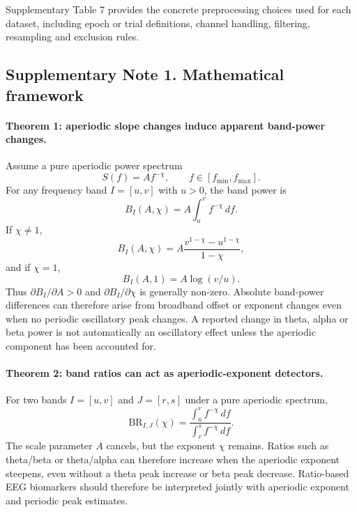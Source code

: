 Supplementary Table 7 provides the concrete preprocessing choices used for each dataset, including epoch or trial definitions, channel handling, filtering, resampling and exclusion rules.



\subsection*{Supplementary Note 1. Mathematical framework}

\paragraph{Theorem 1: aperiodic slope changes induce apparent band-power changes.}
Assume a pure aperiodic power spectrum
\[
S(f)=A f^{-\chi}, \qquad f \in [f_{\min}, f_{\max}].
\]
For any frequency band $I=[u,v]$ with $u>0$, the band power is
\[
B_I(A,\chi)=A\int_u^v f^{-\chi}\,df.
\]
If $\chi\neq1$,
\[
B_I(A,\chi)=A\frac{v^{1-\chi}-u^{1-\chi}}{1-\chi},
\]
and if $\chi=1$,
\[
B_I(A,1)=A\log(v/u).
\]
Thus $\partial B_I/\partial A>0$ and $\partial B_I/\partial \chi$ is generally non-zero. Absolute band-power differences can therefore arise from broadband offset or exponent changes even when no periodic oscillatory peak changes. A reported change in theta, alpha or beta power is not automatically an oscillatory effect unless the aperiodic component has been accounted for.

\paragraph{Theorem 2: band ratios can act as aperiodic-exponent detectors.}
For two bands $I=[u,v]$ and $J=[r,s]$ under a pure aperiodic spectrum,
\[
\mathrm{BR}_{I,J}(\chi)=
\frac{\int_u^v f^{-\chi}\,df}{\int_r^s f^{-\chi}\,df}.
\]
The scale parameter $A$ cancels, but the exponent $\chi$ remains. Ratios such as theta/beta or theta/alpha can therefore increase when the aperiodic exponent steepens, even without a theta peak increase or beta peak decrease. Ratio-based EEG biomarkers should therefore be interpreted jointly with aperiodic exponent and periodic peak estimates.

